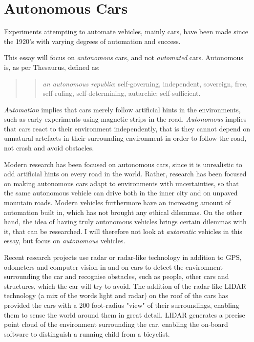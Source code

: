 \chapter{Autonomous Cars}

Experiments attempting to automate vehicles, mainly cars, have been made since the 1920's with varying degrees of automation and success. 

This essay will focus on \textit{autonomous} cars, and not \textit{automated} cars. Autonomous is, as per Thesaurus, defined as: 

\begin{quote}
	\blockquote{\textit{an autonomous republic}: self-governing, independent, sovereign, free, self-ruling, self-determining, autarchic; self-sufficient.}
\end{quote}

\noindent \textit{Automation} implies that cars merely follow artificial hints in the environments, such as early experiments using magnetic strips in the road. \cite{wiki:autonomoushistory}
\textit{Autonomous} implies that cars react to their environment independently, that is they cannot depend on unnatural artefacts in their surrounding environment in order to follow the road, not crash and avoid obstacles.

\newpar Modern research has been focused on autonomous cars, since it is unrealistic to add artificial hints on every road in the world. Rather, research has been focused on making autonomous cars adapt to environments with uncertainties, so that the same autonomous vehicle can drive both in the inner city and on unpaved mountain roads. Modern vehicles furthermore have an increasing amount of automation built in, which has not brought any ethical dilemmas. On the other hand, the idea of having truly autonomous vehicles brings certain dilemmas with it, that can be researched. I will therefore not look at \textit{automatic} vehicles in this essay, but focus on \textit{autonomous} vehicles. 

\newpar Recent research projects use radar or radar-like technology in addition to GPS, odometers and computer vision in and on cars to detect the environment surrounding the car and recognise obstacles, such as people, other cars and structures, which the car will try to avoid. The addition of the radar-like LIDAR technology (a mix of the words light and radar) on the roof of the cars has provided the cars with a 200 foot-radius "view" of their surroundings, enabling them to sense the world around them in great detail. LIDAR generates a precise point cloud of the environment surrounding the car, enabling the on-board software to distinguish a running child from a bicyclist.

